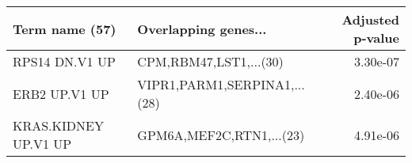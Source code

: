 \begin{tabular}{llr}
\toprule
      Term name (57) &         Overlapping genes... &  Adjusted p-value \\
\midrule
      RPS14 DN.V1 UP &       CPM,RBM47,LST1,...(30) &          3.30e-07 \\
       ERB2 UP.V1 UP & VIPR1,PARM1,SERPINA1,...(28) &          2.40e-06 \\
KRAS.KIDNEY UP.V1 UP &     GPM6A,MEF2C,RTN1,...(23) &          4.91e-06 \\
\bottomrule
\end{tabular}
